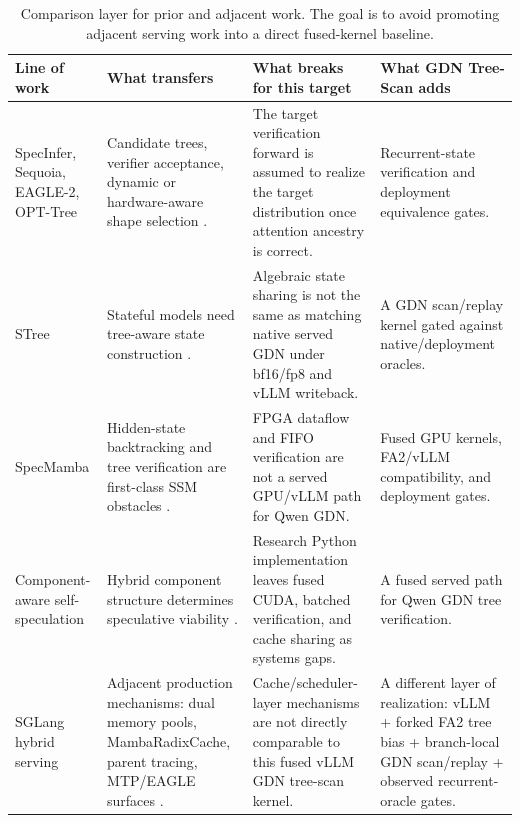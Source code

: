 \documentclass[conference]{IEEEtran}
\newcommand{\sys}{GDN Tree-Scan}
\newcommand{\rowsep}{\specialrule{0.15pt}{1.2pt}{1.2pt}}
\begin{document}
\begin{table}[t]
\caption{Comparison layer for prior and adjacent work. The goal is to avoid promoting adjacent serving work into a direct fused-kernel baseline.}
\label{tab:prior}
\centering
\scriptsize
\begin{adjustbox}{width=\textwidth}
\begin{tabular}{L{0.18\textwidth} L{0.24\textwidth} L{0.26\textwidth} L{0.20\textwidth}}
\toprule
Line of work & What transfers & What breaks for this target & What \sys{} adds \\
\midrule
SpecInfer, Sequoia, EAGLE-2, OPT-Tree & Candidate trees, verifier acceptance, dynamic or hardware-aware shape selection \cite{miao2023specinfer,chen2024sequoia,li2024eagle,wang2024opt}. & The target verification forward is assumed to realize the target distribution once attention ancestry is correct. & Recurrent-state verification and deployment equivalence gates. \\
\rowsep
STree & Stateful models need tree-aware state construction \cite{wu2025stree}. & Algebraic state sharing is not the same as matching native served GDN under bf16/fp8 and vLLM writeback. & A GDN scan/replay kernel gated against native/deployment oracles. \\
\rowsep
SpecMamba & Hidden-state backtracking and tree verification are first-class SSM obstacles \cite{zhong2025specmamba}. & FPGA dataflow and FIFO verification are not a served GPU/vLLM path for Qwen GDN. & Fused GPU kernels, FA2/vLLM compatibility, and deployment gates. \\
\rowsep
Component-aware self-speculation & Hybrid component structure determines speculative viability \cite{borobia2026component}. & Research Python implementation leaves fused CUDA, batched verification, and cache sharing as systems gaps. & A fused served path for Qwen GDN tree verification. \\
\rowsep
SGLang hybrid serving & Adjacent production mechanisms: dual memory pools, MambaRadixCache, parent tracing, MTP/EAGLE surfaces \cite{pytorch2025sglang,sglang2026qwen,sglang2026specdocs}. & Cache/scheduler-layer mechanisms are not directly comparable to this fused vLLM GDN tree-scan kernel. & A different layer of realization: vLLM + forked FA2 tree bias + branch-local GDN scan/replay + observed recurrent-oracle gates. \\
\bottomrule
\end{tabular}
\end{adjustbox}
\end{table}
\end{document}
